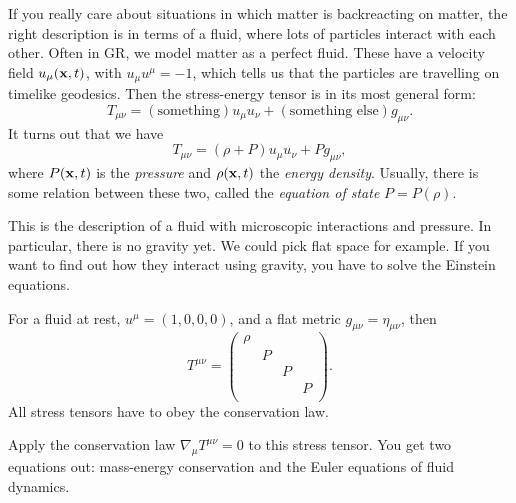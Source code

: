 If you really care about situations in which matter is backreacting on matter, the right description is in terms of a fluid, where lots of particles interact with each other.
Often in GR, we model matter as a perfect fluid.
These have a velocity field $u_{\mu} (\vb{x}, t)$, with $u_{\mu} u^{\mu} = -1$, which tells us that the particles are travelling on timelike geodesics.
Then the stress-energy tensor is in its most general form:
\begin{equation}
  T_{\mu\nu} = (\text{something}) u_{\mu} u_{\nu} + (\text{something else}) g_{\mu\nu}.
\end{equation}
It turns out that we have 
\begin{equation}
  T_{\mu\nu} = (\rho + P) u_{\mu} u_{\nu} + P g_{\mu\nu},
\end{equation}
where $P(\vb{x}, t)$ is the \emph{pressure} and $\rho(\vb{x}, t)$ the \emph{energy density}.
Usually, there is some relation between these two, called the \emph{equation of state} $P = P(\rho)$.
\begin{remark}
  This is the description of a fluid with microscopic interactions and pressure. In particular, there is no gravity yet. We could pick flat space for example. If you want to find out how they interact using gravity, you have to solve the Einstein equations.
\end{remark}

For a fluid at rest, $u^{\mu} = (1, 0, 0, 0)$, and a flat metric $g_{\mu\nu} = \eta_{\mu\nu}$, then
\begin{equation}
  T^{\mu\nu} = 
  \begin{pmatrix}
   \rho &  &  &  \\
    & P &  &  \\
    &  & P &  \\
    &  &  & P \\
  \end{pmatrix}.
\end{equation}
All stress tensors have to obey the conservation law.
\begin{exercise}
  Apply the conservation law $\nabla_{\mu} T^{\mu\nu} = 0$ to this stress tensor.
  You get two equations out: mass-energy conservation and the Euler equations of fluid dynamics.
\end{exercise}
